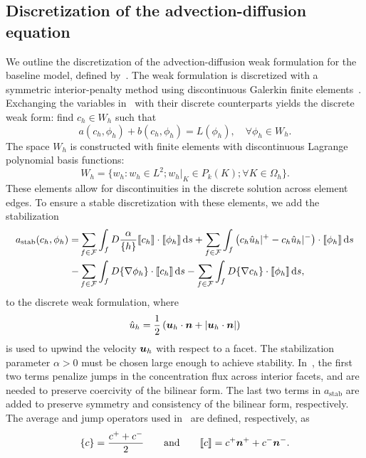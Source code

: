 \documentclass{WileyMSP-template}
\begin{document}
\subsection{Discretization of the advection-diffusion equation}
We outline the discretization of the advection-diffusion weak formulation
for the baseline model, defined
by~.
The weak formulation is discretized with a symmetric interior-penalty method using
discontinuous Galerkin finite elements~\cite{Arnold1982AnElements}.
Exchanging the variables in~ with their discrete
counterparts yields the discrete weak form: find $c_h\in W_h$ such that
\begin{equation*}
    a(c_h, \phi_h) + b(c_h, \phi_h) = L(\phi_h), \quad\forall\phi_h\in W_h.
\end{equation*}
The space $W_h$ is constructed with finite elements with
discontinuous Lagrange polynomial basis functions:
\begin{equation}
    W_h = \Big\{w_h : w_h\in L^2;  w_h\vert_K\in P_k(K); \forall K\in\Omega_h\Big\}.
\end{equation}
These elements allow for discontinuities in the discrete solution across element edges.
To ensure a stable discretization with these elements, we add the stabilization
\begin{equation}
    \begin{aligned}
        a_{\mathrm{stab}}(c_h, \phi_h)
        = &\sum_{f\in \mathcal{F}}\int_f{D\frac{\alpha}{\{h\}}\llbracket c_h\rrbracket\cdot\llbracket\phi_h\rrbracket}\,\mathrm ds
        +\sum_{f\in \mathcal{F}}\int_f{\left({c_h \hat{u}_h}|^+ - {c_h \hat{u}_h}|^-\right)\cdot\llbracket\phi_h\rrbracket}\,\mathrm ds  \\
         -&\sum_{f\in \mathcal{F}}\int_f{D\{\nabla\phi_h\}\cdot\llbracket c_h\rrbracket}\,\mathrm ds
         -\sum_{f\in \mathcal{F}}\int_f{D\{\nabla c_h\}\cdot\llbracket\phi_h\rrbracket}\,\mathrm ds,
    \end{aligned}\label{eq:SIP_stabilization}
\end{equation}
to the discrete weak formulation, where
\begin{equation*}
    \hat{u}_h = \frac{1}{2}\left(\bm{u}_h\cdot\bm{n} + \vert\bm{u}_h\cdot\bm{n}\vert\right)
\end{equation*}
is used to upwind the velocity $\bm{u}_h$ with respect to a
facet. The stabilization parameter $\alpha>0$ must be chosen
large enough to achieve stability. In~, the first two terms
penalize jumps in the concentration flux across interior facets,
and are needed to preserve coercivity of the bilinear form.
The last two terms in $a_{\mathrm{stab}}$ are
added to preserve symmetry and consistency of the bilinear form, respectively.
The average and jump operators used
in~ are defined, respectively, as
\begin{equation*}
    \{c\} = \frac{c^+ + c^-}{2} \qquad\mathrm{and}\qquad \llbracket c\rrbracket = c^+\bm{n}^+ + c^-\bm{n}^-.
\end{equation*}
\end{document}
